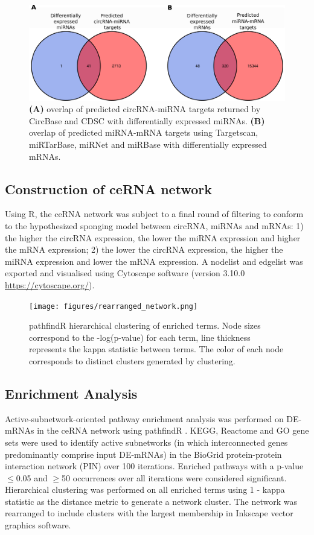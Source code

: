 \documentclass[twocolumn]{bmcart}%
\begin{document}
\begin{figure}[ht!]
    \includegraphics[scale=0.45]{figures/database_overlaps.png}
    \caption{\textbf{(A)} overlap of predicted circRNA-miRNA targets returned by CircBase and CDSC with differentially expressed miRNAs. \textbf{(B)} overlap of predicted miRNA-mRNA targets using Targetscan, miRTarBase, miRNet and miRBase with differentially expressed mRNAs.}
    \label{fig:db_overlaps}
\end{figure}

\subsection*{\textbf{Construction of ceRNA network}}
Using R, the ceRNA network was subject to a final round of filtering to conform to the hypothesized sponging model between circRNA, miRNAs and mRNAs: 1) the higher the circRNA expression, the lower the miRNA expression and higher the mRNA expression; 2) the lower the circRNA expression, the higher the miRNA expression and lower the mRNA expression. A nodelist and edgelist was exported and visualised using Cytoscape software \cite{Shannon2003Nov} (version 3.10.0 \url{https://cytoscape.org/}).

\begin{figure}[h!]
  \texttt{[image: figures/rearranged\_network.png]}
  \caption{pathfindR hierarchical clustering of enriched terms. Node sizes correspond to the -log(p-value) for each term, line thickness represents the kappa statistic between terms. The color of each node corresponds to distinct clusters generated by clustering.}
  \label{fig:pathfindRnetwork}
\end{figure}

\subsection*{\textbf{Enrichment Analysis}}
Active-subnetwork-oriented pathway enrichment analysis was performed on DE-mRNAs in the ceRNA network using pathfindR \cite{Ulgen2019Sep}. KEGG, Reactome and GO gene sets were used to identify active subnetworks (in which interconnected genes predominantly comprise input DE-mRNAs) in the BioGrid protein-protein interaction network (PIN) over 100 iterations. Enriched pathways with a p-value $\leq$0.05 and $\geq$50 occurrences over all iterations were considered significant. Hierarchical clustering was performed on all enriched terms using 1 - kappa statistic as the distance metric to generate a network cluster. The network was rearranged to include clusters with the largest membership in Inkscape vector graphics software.
\end{document}
